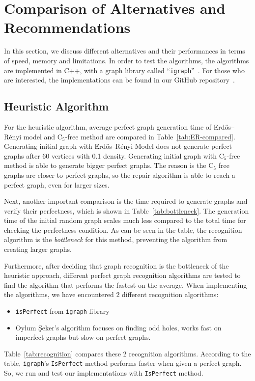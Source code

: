 \section{Comparison of Alternatives and Recommendations}
In this section, we discuss different alternatives and their performances in terms of speed, memory and limitations. In order to test the algorithms, the algorithms are implemented in C++, with a graph library called ``\texttt{igraph}''~\cite{igraph}. For those who are interested, the implementations can be found in our GitHub repository~\cite{repository}.

\subsection{Heuristic Algorithm}



For the heuristic algorithm, average perfect graph generation time of Erdős–Rényi model and C$_5$-free method are compared in Table~\ref{tab:ER-compared}. Generating initial graph with Erdős–Rényi Model does not generate perfect graphs after 60 vertices with 0.1 density. Generating initial graph with C$_5$-free method is able to generate bigger perfect graphs. The reason is the C$_5$ free graphs are closer to perfect graphs, so the repair algorithm is able to reach a perfect graph, even for larger sizes.



Next, another important comparison is the time required to generate graphs and verify their perfectness, which is shown in Table~\ref{tab:bottleneck}. The generation time of the initial random graph scales much less compared to the total time for checking the perfectness condition. As can be seen in the table, the recognition algorithm is the \textit{bottleneck} for this method, preventing the algorithm from creating larger graphs.



Furthermore, after deciding that graph recognition is the bottleneck of the heuristic approach, different perfect graph recognition algorithms are tested to find the algorithm that performs the fastest on the average. When implementing the algorithms, we have encountered 2 different recognition algorithms:
\begin{itemize}
    \item \texttt{isPerfect} from \texttt{igraph} library
    \item Oylum Şeker's algorithm focuses on finding odd holes, works fast on imperfect graphs but slow on perfect graphs.
\end{itemize}
Table~\ref{tab:recognition} compares these 2 recognition algorithms. According to the table, \texttt{igraph}'s \texttt{IsPerfect} method performs faster when given a perfect graph. So, we run and test our implementations with \texttt{IsPerfect} method.


